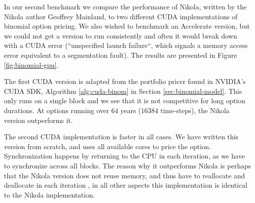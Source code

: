 In our second benchmark we compare the performance of Nikola, written
by the Nikola author Geoffrey Mainland, to two different CUDA
implementations of binomial option pricing. We also wished to
benchmark an Accelerate version, but we could not get a version to run
consistently and often it would break down with a CUDA error
(``unspecified launch failure``, which signals a memory access error
equivalent to a segmentation fault). The results are presented in
Figure \ref{fig:binomial-gpu}.

The first CUDA version is adapted from the portfolio pricer found in
NVIDIA's CUDA SDK, Algorithm \ref{alg:cuda-binom} in Section
\ref{sec:binomial-model}. This only runs on a single block and we see
that it is not competitive for long option durations. At options
running over 64 years ($16384$ time-steps), the Nikola
version outperforms it.

The second CUDA implementation is faster in all cases. We have written
this version from scratch, and uses all available cores to price the
option. Synchronization happens by returning to the CPU in each
iteration, as we have to synchronize across all blocks. The reason why
it outperforms Nikola is perhaps that the Nikola version does not
reuse memory, and thus have to reallocate and deallocate in each
iteration , in all other aspects
this implementation is identical to the Nikola implementation.

